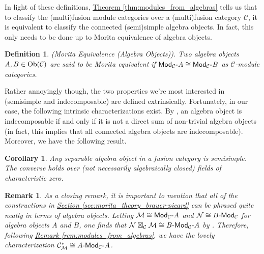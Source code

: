 \documentclass[12pt, reqno]{amsart}
\numberwithin{equation}{section}
\theoremstyle{plainspace}
\newtheorem{corollary}[theorem]{Corollary}
\theoremstyle{definitionspace}
\newtheorem{definition}[theorem]{Definition}
\theoremstyle{remarkspace}
\newtheorem{remark}[theorem]{Remark}
\newcommand{\mathcat}[1]{\mathcal{#1}}
\newcommand{\Ob}{\textup{Ob}}
\newcommand{\textcat}[1]{\textup{\textsf{#1}}}
\newcommand{\rmodcat}[2][]{\textcat{Mod}_{#1}\textcat{-}#2}
\newcommand{\lmodcat}[2][]{#2\textcat{-Mod}_{#1}}
\newcommand{\bimodcat}[3][]{#2\textcat{-Mod}_{#1}\textcat{-}#3}
\begin{document}
\noindent In light of these definitions, \hyperref[thm:modules_from_algebras]{Theorem \ref*{thm:modules_from_algebras}} tells us that to classify the (multi)fusion module categories over a (multi)fusion category $\mathcat{C}$, it is equivalent to classify the connected (semi)simple algebra objects. In fact, this only needs to be done up to Morita equivalence of algebra objects.
\newline

\begin{definition}\label{def:morita_equivalence_algebra}{\em (Morita Equivalence (Algebra Objects)).} \cite[Theorem 7.8.17]{Etingof_2016}
Two algebra objects $A, B \in \Ob(\mathcat{C})$ are said to be {\em Morita equivalent} if $\rmodcat[\mathcat{C}]{A} \cong \rmodcat[\mathcat{C}]{B}$ as $\mathcat{C}$-module categories.
\end{definition}
\leavevmode

\noindent Rather annoyingly though, the two properties we're most interested in (semisimple and indecomposable) are defined extrinsically. Fortunately, in our case, the following intrinsic characterizations exist. By \cite[Remark 3.1]{Ostrik_2003}, an algebra object is indecomposable if and only if it is not a direct sum of non-trivial algebra objects (in fact, this implies that all connected algebra objects are indecomposable). Moreover, we have the following result.
\newline

\begin{corollary}\label{cor:algebra_separable_semisimple} \cite[Proposition 7.8.30]{Etingof_2016} \cite[Corollary 2.6.9]{Douglas_2020}
Any separable algebra object in a fusion category is semisimple. The converse holds over (not necessarily algebraically closed) fields of characteristic zero.
\end{corollary}
\leavevmode

\begin{remark}\label{rem:dual_fusion_category_algebras}
As a closing remark, it is important to mention that all of the constructions in \hyperref[sec:morita_theory_brauer-picard]{Section \ref*{sec:morita_theory_brauer-picard}} can be phrased quite neatly in terms of algebra objects. Letting $\mathcat{M} \cong \rmodcat[\mathcat{C}]{A}$ and $\mathcat{N} \cong \lmodcat[\mathcat{C}]{B}$ for algebra objects $A$ and $B$, one finds that $\mathcat{N} \boxtimes_{\mathcat{C}} \mathcat{M} \cong \bimodcat[\mathcat{C}]{B}{A}$ by \cite[Proposition 7.11.1]{Etingof_2016}. Therefore, following \hyperref[rem:modules_from_algebras]{Remark \ref*{rem:modules_from_algebras}}, we have the lovely characterization $\mathcat{C}_{\mathcat{M}}^{*} \cong \bimodcat[\mathcat{C}]{A}{A}$.
\end{remark}
\leavevmode
\end{document}
